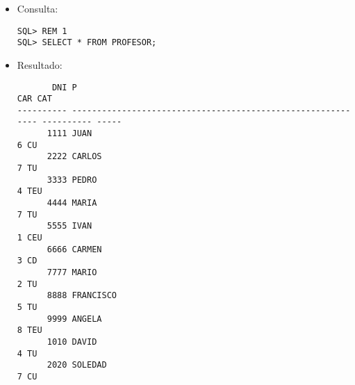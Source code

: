 \documentclass[11pt]{report}
\begin{document}
\begin{itemize}
  \item Consulta:
  \begin{verbatim}
SQL> REM 1
SQL> SELECT * FROM PROFESOR;
  \end{verbatim}
  \item{Resultado:}
  \begin{verbatim}
       DNI P                                                                   CAR CAT                                                                                                                  
---------- ------------------------------------------------------------ ---------- -----                                                                                                                
      1111 JUAN                                                                  6 CU                                                                                                                   
      2222 CARLOS                                                                7 TU                                                                                                                   
      3333 PEDRO                                                                 4 TEU                                                                                                                  
      4444 MARIA                                                                 7 TU                                                                                                                   
      5555 IVAN                                                                  1 CEU                                                                                                                  
      6666 CARMEN                                                                3 CD                                                                                                                   
      7777 MARIO                                                                 2 TU                                                                                                                   
      8888 FRANCISCO                                                             5 TU                                                                                                                   
      9999 ANGELA                                                                8 TEU                                                                                                                  
      1010 DAVID                                                                 4 TU                                                                                                                   
      2020 SOLEDAD                                                               7 CU                                                                                                                   


\end{verbatim}
\end{itemize}
\end{document}
